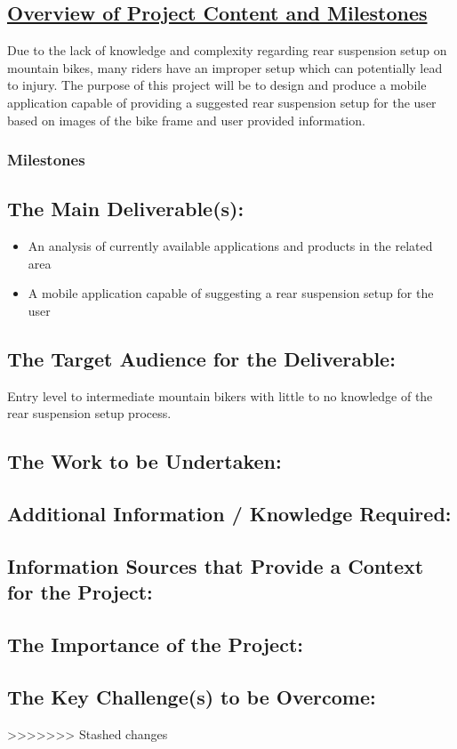 \documentclass[a4paper, 12pt]{article}
\begin{document}
	\subsection[Overview]{\underline{Overview of Project Content and Milestones}}
	Due to the lack of knowledge and complexity regarding rear suspension setup on mountain bikes, many riders have an improper setup which can potentially lead to injury. The purpose of this project will be to design and produce a mobile application capable of providing a suggested rear suspension setup for the user based on images of the bike frame and user provided information. 
	\subsubsection{Milestones}
	
	
	\subsection[Deliverables]{The Main Deliverable(s):}
	\begin{itemize}
		\item An analysis of currently available applications and products in the related area
		\item A mobile application capable of suggesting a rear suspension setup for the user
	\end{itemize}
	
	\subsection[Audience]{The Target Audience for the Deliverable:}
	Entry level to intermediate mountain bikers with little to no knowledge of the rear suspension setup process.
	
	\subsection[Work]{The Work to be Undertaken:}
	
	\subsection[Additional Info]{Additional Information / Knowledge Required:}
	
	\subsection[Sources]{Information Sources that Provide a Context for the Project:}
	
	\subsection[Importance]{The Importance of the Project:}
	
	\subsection[Challenges]{The Key Challenge(s) to be Overcome:}
	
>>>>>>> Stashed changes
\end{document}
